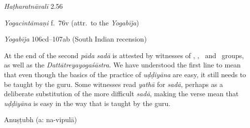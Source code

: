 \begin{ekdosis}
\begin{testimonia}[hp03_062]
\emph{Haṭharatnāvalī} 2.56
\begin{versinnote}
\end{versinnote}

\emph{Yogacintāmaṇi} f.~76v (attr.~to the \emph{Yogabīja})
\begin{versinnote}
\end{versinnote}

\emph{Yogabīja} 106cd–107ab (South Indian recension)
\begin{versinnote}
\end{versinnote}

\end{testimonia}

\begin{philcomm}[hp03_062]
At the end of the second \emph{pāda} \emph{sadā} is attested by witnesses of \textalpha, \texteta, \textepsilon\ and \delta \ groups, as well as the \emph{Dattātreyayogaśāstra}. We have understood the first line to mean that even though the basics of the practice of \emph{uḍḍiyāna} are easy, it still needs to be taught by the guru. Some witnesses read \emph{yathā} for \emph{sadā}, perhaps as a deliberate substitution of the more difficult \emph{sadā}, making the verse mean that \emph{uḍḍiyāna} is easy in the way that is taught by the guru. 
\end{philcomm}

\begin{metre}[hp03_062]
Anuṣṭubh (a: na-vipulā)
\end{metre}


\end{ekdosis}

